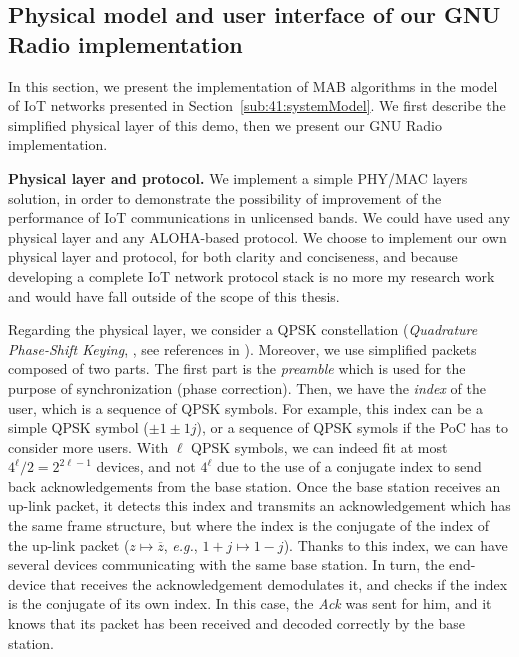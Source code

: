 

\subsection{Physical model and user interface of our GNU Radio implementation}
\label{sub:42:implementation}

In this section, we present the implementation of MAB algorithms in the model of IoT networks presented in Section~\ref{sub:41:systemModel}.
We first describe the simplified physical layer of this demo, then we present our GNU Radio implementation.


\textbf{Physical layer and protocol.}
%
We implement a simple PHY/MAC layers solution, in order to demonstrate the possibility of improvement of the performance of IoT communications in unlicensed bands. We could have used any physical layer and any ALOHA-based protocol.
We choose to implement our own physical layer and protocol, for both clarity and conciseness, and because developing a complete IoT network protocol stack is no more my research work and would have fall outside of the scope of this thesis.

Regarding the physical layer, we consider a QPSK constellation (\emph{Quadrature Phase-Shift Keying}, \eg, see references in \cite{Bodinier17}). Moreover, we use simplified packets composed of two parts.
The first part is the \emph{preamble} which is used for the purpose of synchronization (phase correction).
Then, we have the \emph{index} of the user, which is a sequence of QPSK symbols.
For example, this index can be a simple QPSK symbol ($\pm1\pm1j$), or a sequence of QPSK symols if the PoC has to consider more users.
With $\ell$ QPSK symbols, we can indeed fit at most $4^{\ell}/2 = 2^{2\ell-1}$ devices, and not $4^{\ell}$ due to the use of a conjugate index to send back acknowledgements from the base station.
Once the base station receives an up-link packet, it detects this index and transmits an acknowledgement which has the same frame structure, but where the index is the conjugate of the index of the up-link packet ($z \mapsto \overline{z}$, \emph{e.g.}, $1+j \mapsto 1-j$).
Thanks to this index, we can have several devices communicating with the same base station.
%
In turn, the end-device that receives the acknowledgement demodulates it, and checks if the index is the conjugate of its own index.
In this case, the \emph{Ack} was sent for him, and it knows that its packet has been received and decoded correctly by the base station.


